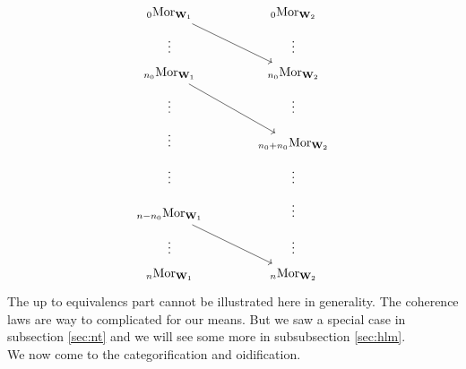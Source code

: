 \[
\begin{tikzcd}[row sep=tiny,column sep=large]
  {}_{0}\mathrm{Mor}_{\mathbf{W}_{1}}
  \arrow{rdd}{}
  &
  {}_{0}\mathrm{Mor}_{\mathbf{W}_{2}}
  \\
  \vdots
  &
  \vdots
  \\
  {}_{n_{0}}\mathrm{Mor}_{\mathbf{W}_{1}}
  \arrow{rdd}{}
  &
  {}_{n_{0}}\mathrm{Mor}_{\mathbf{W}_{2}}
  \\
  \vdots
  &
  \vdots
  \\
  \vdots
  &
  {}_{n_{0}+n_{0}}\mathrm{Mor}_{\mathbf{W}_{2}}
  \\
  \vdots
  &
  \vdots
  \\
  {}_{n-n_{0}}\mathrm{Mor}_{\mathbf{W}_{1}}
  \arrow{rdd}{}
  &
  \vdots
  \\
  \vdots
  &
  \vdots
  \\
  {}_{n}\mathrm{Mor}_{\mathbf{W}_{1}}
  &
  {}_{n}\mathrm{Mor}_{\mathbf{W}_{2}}
\end{tikzcd}
\]
The up to equivalencs part cannot be illustrated here in generality. The coherence laws are way to complicated for our means. But we saw a special case in subsection \ref{sec:nt} and we will see some more in subsubsection \ref{sec:hlm}.
\\
We now come to the categorification and oidification.
